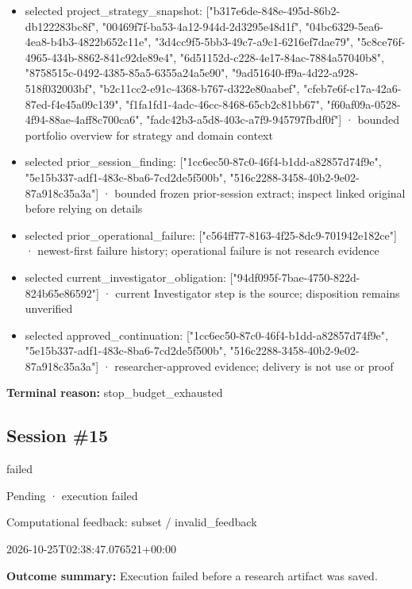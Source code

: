 \documentclass[11pt]{article}
\begin{document}
\begin{itemize}
\item selected project\_strategy\_snapshot: ["b317e6de-848e-495d-86b2-db122283bc8f", "00469f7f-ba53-4a12-944d-2d3295e48d1f", "04bc6329-5ea6-4ea8-b4b3-4822b652c11e", "3d4cc9f5-5bb3-49c7-a9c1-6216ef7dae79", "5c8ce76f-4965-434b-8862-841c92de89e4", "6d51152d-c228-4e17-84ac-7884a57040b8", "8758515c-0492-4385-85a5-6355a24a5e90", "9ad51640-ff9a-4d22-a928-518f032003bf", "b2c11cc2-e91c-4368-b767-d322e80aabef", "cfeb7e6f-c17a-42a6-87ed-f4e45a09c139", "f1fa1fd1-4adc-46cc-8468-65cb2c81bb67", "f60af09a-0528-4f94-88ae-4aff8c700ca6", "fadc42b3-a5d8-403c-a7f9-945797fbdf0f"] · bounded portfolio overview for strategy and domain context
\item selected prior\_session\_finding: ["1cc6ec50-87c0-46f4-b1dd-a82857d74f9e", "5e15b337-adf1-483c-8ba6-7cd2de5f500b", "516c2288-3458-40b2-9e02-87a918c35a3a"] · bounded frozen prior-session extract; inspect linked original before relying on details
\item selected prior\_operational\_failure: ["c564ff77-8163-4f25-8dc9-701942e182ce"] · newest-first failure history; operational failure is not research evidence
\item selected current\_investigator\_obligation: ["94df095f-7bae-4750-822d-824b65e86592"] · current Investigator step is the source; disposition remains unverified
\item selected approved\_continuation: ["1cc6ec50-87c0-46f4-b1dd-a82857d74f9e", "5e15b337-adf1-483c-8ba6-7cd2de5f500b", "516c2288-3458-40b2-9e02-87a918c35a3a"] · researcher-approved evidence; delivery is not use or proof
\end{itemize}
\textbf{Terminal reason:} stop\_budget\_exhausted\par
\subsection{Session \#15}
\begin{description}[style=nextline,font=\normalfont\bfseries,leftmargin=0pt,labelsep=0pt]
\item[Execution status] failed
\item[Outcome] Pending · execution failed
\item[Strategy] Computational feedback: subset / invalid\_feedback
\item[Started] 2026-10-25T02:38:47.076521+00:00
\end{description}
\textbf{Outcome summary:} Execution failed before a research artifact was saved.\par
\end{document}
